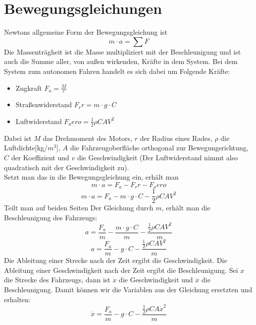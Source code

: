 \section{Bewegungsgleichungen}
Newtons allgemeine Form der Bewegungsgleichung ist
\begin{equation}
  m\cdot a = \sum F  
\end{equation}
Die Massenträgheit ist die Masse multipliziert mit der Beschleunigung und ist auch die Summe aller, von außen wirkenden, Kräfte in dem System.
Bei dem System zum autonomen Fahren handelt es sich dabei um Folgende Kräfte:
\begin{itemize}
\item Zugkraft $F_a = \frac{M}{r} $
\item Straßenwiderstand $F_rr = m\cdot g\cdot C$
\item Luftwiderstand $F_aero = \frac{1}{2}\rho C A V^{2}$
\end{itemize}
Dabei ist $M$ das Drehmoment des Motors, $r$ der Radius eines Rades, $\rho$ die Luftdichte[kg/$m^{3}$], $A$ die Fahrzeugoberfläche orthogonal zur Bewegungsrichtung, $C$ der Koeffizient und $v$ die Geschwindigkeit (Der Luftwiderstand nimmt also quadratisch mit der Geschwindigkeit zu).\\
Setzt man das in die Bewegungsgleichung ein, erhält man
\begin{equation}
  m\cdot a = F_a -  F_rr - F_aero 
\end{equation}
\begin{equation}
  m\cdot a = F_a -  m\cdot g\cdot C - \frac{1}{2}\rho C A V^{2} 
\end{equation}
Teilt man auf beiden Seiten Der Gleichung durch $m$, erhält man die Beschleunigung des Fahrzeugs:
\begin{equation}
  a = \frac{F_a}{m} -  \frac{m\cdot g\cdot C}{m} - \frac{\frac{1}{2}\rho C A V^{2}}{m} 
\end{equation}
\begin{equation}
  a = \frac{F_a}{m} -  g\cdot C - \frac{\frac{1}{2}\rho C A V^{2}}{m} 
\end{equation}
Die Ableitung einer Strecke nach der Zeit ergibt die Geschwindigkeit. Die Ableitung einer Geschwindigkeit nach der Zeit ergibt die Beschleunigung. Sei $x$ die Strecke des Fahrzeugs, dann ist $\dot{x}$ die Geschwindigkeit und $\ddot{x}$ die Beschleunigung.
Damit können wir die Variablen aus der Gleichung ersetzten und erhalten:
\begin{equation}
 \ddot{x} = \frac{F_a}{m} -  g\cdot C - \frac{\frac{1}{2}\rho C A \dot{x}^{2}}{m} 
\end{equation}
